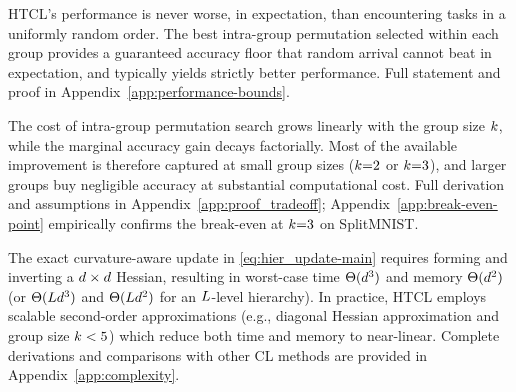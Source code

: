 \begin{theorem}
\label{thm:perf-bound-main}
HTCL's performance is never worse, in expectation, than encountering tasks in a uniformly random order. The best intra-group permutation selected within each group provides a guaranteed accuracy floor that random arrival cannot beat in expectation, and typically yields strictly better performance. Full statement and proof in Appendix~\ref{app:performance-bounds}.
\end{theorem}

\begin{proposition} 
\label{thm:tradeoff-main}
The cost of intra-group permutation search grows linearly with the group size $k$, while the marginal accuracy gain decays factorially. Most of the available improvement is therefore captured at small group sizes ($k{=}2$ or $k{=}3$), and larger groups buy negligible accuracy at substantial computational cost. Full derivation and assumptions in Appendix~\ref{app:proof_tradeoff}; Appendix~\ref{app:break-even-point} empirically confirms the break-even at $k{=}3$ on SplitMNIST.
\end{proposition}

\begin{remark}
\label{rem:complexity}
The exact curvature-aware update in \eqref{eq:hier_update-main} requires forming and inverting a $d \times d$ Hessian, resulting in worst-case time $\Theta(d^3)$ and memory $\Theta(d^2)$ (or $\Theta(L d^3)$ and $\Theta(L d^2)$ for an $L$-level hierarchy). In practice, HTCL employs scalable second-order approximations (e.g., diagonal Hessian approximation and group size $k < 5$) which reduce both time and memory to near-linear. Complete derivations and comparisons with other CL methods are provided in Appendix~\ref{app:complexity}.
\end{remark}